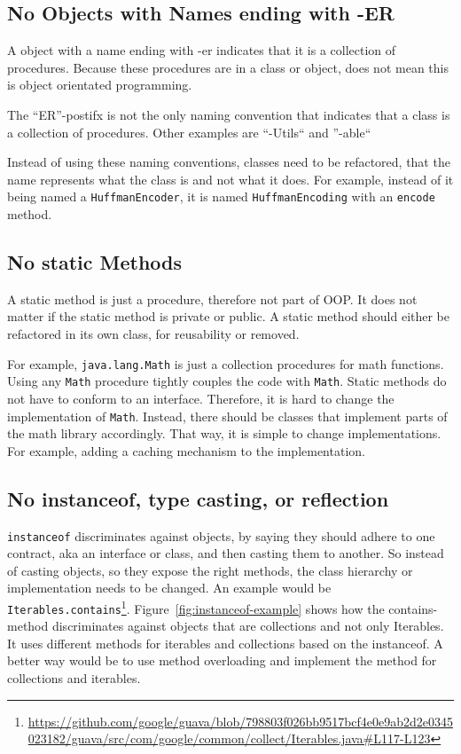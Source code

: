 \subsection{No Objects with Names ending with -ER}\label{subsec:no-objects-with-names-ending-with--er}
A object with a name ending with -er indicates that it is a collection of procedures.
Because these procedures are in a class or object, does not mean this is object orientated programming.

The ``ER''-postifx is not the only naming convention that indicates that a class is a collection of procedures.
Other examples are ``-Utils`` and ''-able``

Instead of using these naming conventions, classes need to be refactored, that the name represents what the class is and not what it does.
For example, instead of it being named a \texttt{HuffmanEncoder}, it is named \texttt{HuffmanEncoding} with an \texttt{encode} method.\cite{er-postfix,elegant-objects}

\subsection{No static Methods}\label{subsec:no-static-methods}
A static method is just a procedure, therefore not part of \gls{OOP}.
It does not matter if the static method is private or public.
A static method should either be refactored in its own class, for reusability or removed.

For example, \texttt{java.lang.Math} is just a collection procedures for math functions.
Using any \texttt{Math} procedure tightly couples the code with \texttt{Math}.
Static methods do not have to conform to an interface.
Therefore, it is hard to change the implementation of \texttt{Math}.
Instead, there should be classes that implement parts of the math library accordingly.
That way, it is simple to change implementations.
For example, adding a caching mechanism to the implementation.\cite{elegant-objects}

\subsection{No instanceof, type casting, or reflection}\label{subsec:no-instanceof-type-casting-or-reflection}
\texttt{instanceof} discriminates against objects, by saying they should adhere to one contract, aka an interface or class, and then casting them to another.
So instead of casting objects, so they expose the right methods, the class hierarchy or implementation needs to be changed.
An example would be \texttt{Iterables.contains}\footnote{\url{https://github.com/google/guava/blob/798803f026bb9517bcf4e0e9ab2d2e0345023182/guava/src/com/google/common/collect/Iterables.java\#L117-L123}}.
Figure\ \ref{fig:instanceof-example} shows how the contains-method discriminates against objects that are collections and not only Iterables.
It uses different methods for iterables and collections based on the instanceof.
A better way would be to use method overloading and implement the method for collections and iterables.

